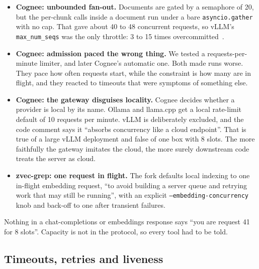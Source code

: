 \documentclass[11pt]{article}
\newcommand{\code}[1]{\texttt{#1}}
\begin{document}
\begin{itemize}
  \item \textbf{Cognee: unbounded fan-out.} Documents are gated by a semaphore of 20, but the
    per-chunk calls inside a document run under a bare \code{asyncio.gather} with no cap. That gave
    about 40 to 48 concurrent requests, so vLLM's \code{max\_num\_seqs} was the only throttle: 3 to
    15 times overcommitted~\cite{cognee3870}.
  \item \textbf{Cognee: admission paced the wrong thing.} We tested a requests-per-minute limiter,
    and later Cognee's automatic one. Both made runs worse. They pace how often requests start,
    while the constraint is how many are in flight, and they reacted to timeouts that were symptoms
    of something else.
  \item \textbf{Cognee: the gateway disguises locality.} Cognee decides whether a provider is local
    by its name. Ollama and llama.cpp get a local rate-limit default of 10 requests per minute.
    vLLM is deliberately excluded, and the code comment says it ``absorbs concurrency like a cloud
    endpoint''. That is true of a large vLLM deployment and false of one box with 8 slots. The more
    faithfully the gateway imitates the cloud, the more surely downstream code treats the server as
    cloud.
  \item \textbf{zvec-grep: one request in flight.} The fork defaults local indexing to one in-flight
    embedding request, ``to avoid building a server queue and retrying work that may still be
    running'', with an explicit \code{--embedding-concurrency} knob and back-off to one after
    transient failures.
\end{itemize}
Nothing in a chat-completions or embeddings response says ``you are request 41 for 8 slots''.
Capacity is not in the protocol, so every tool had to be told.

\subsection{Timeouts, retries and liveness}
\label{sec:liveness}
\end{document}
